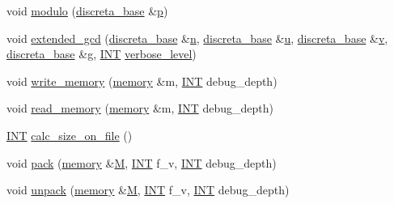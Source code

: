 \begin{DoxyCompactItemize}
\item 
void \mbox{\hyperlink{classdiscreta__base_ac4ee015a4115c5f5851cb3da41c8eca0}{modulo}} (\mbox{\hyperlink{classdiscreta__base}{discreta\+\_\+base}} \&\mbox{\hyperlink{alphabet2_8_c_a533391314665d6bf1b5575e9a9cd8552}{p}})
\item 
void \mbox{\hyperlink{classdiscreta__base_acf4c69f8f0f01f8af975c131121180f4}{extended\+\_\+gcd}} (\mbox{\hyperlink{classdiscreta__base}{discreta\+\_\+base}} \&\mbox{\hyperlink{simeon_8_c_a7f2cd26777ce0ff3fdaf8d02aacbddfb}{n}}, \mbox{\hyperlink{classdiscreta__base}{discreta\+\_\+base}} \&\mbox{\hyperlink{alphabet2_8_c_a5874b4c2ec2e28321eea4e4871d08222}{u}}, \mbox{\hyperlink{classdiscreta__base}{discreta\+\_\+base}} \&\mbox{\hyperlink{simeon_8_c_aeb3f3030944801b163bc3b829a7f6710}{v}}, \mbox{\hyperlink{classdiscreta__base}{discreta\+\_\+base}} \&g, \mbox{\hyperlink{galois_8h_a09fddde158a3a20bd2dcadb609de11dc}{I\+NT}} \mbox{\hyperlink{simeon_8_c_a818073fbcc2f439e7c56952f67386122}{verbose\+\_\+level}})
\item 
void \mbox{\hyperlink{classdiscreta__base_a449ed7914b693346288f56a60b12c4af}{write\+\_\+memory}} (\mbox{\hyperlink{classmemory}{memory}} \&m, \mbox{\hyperlink{galois_8h_a09fddde158a3a20bd2dcadb609de11dc}{I\+NT}} debug\+\_\+depth)
\item 
void \mbox{\hyperlink{classdiscreta__base_a224239da232eb4165783845a48e8b170}{read\+\_\+memory}} (\mbox{\hyperlink{classmemory}{memory}} \&m, \mbox{\hyperlink{galois_8h_a09fddde158a3a20bd2dcadb609de11dc}{I\+NT}} debug\+\_\+depth)
\item 
\mbox{\hyperlink{galois_8h_a09fddde158a3a20bd2dcadb609de11dc}{I\+NT}} \mbox{\hyperlink{classdiscreta__base_ae342640849a0b5bd6096b8e29c7145ff}{calc\+\_\+size\+\_\+on\+\_\+file}} ()
\item 
void \mbox{\hyperlink{classdiscreta__base_aca663109cfebec3214b8f55a1234b3a1}{pack}} (\mbox{\hyperlink{classmemory}{memory}} \&\mbox{\hyperlink{plane__search_8_c_ad2d23ebd03187a91edd45b1d5e496265}{M}}, \mbox{\hyperlink{galois_8h_a09fddde158a3a20bd2dcadb609de11dc}{I\+NT}} f\+\_\+v, \mbox{\hyperlink{galois_8h_a09fddde158a3a20bd2dcadb609de11dc}{I\+NT}} debug\+\_\+depth)
\item 
void \mbox{\hyperlink{classdiscreta__base_a62b20a8798c6fcfdc2ee4555bc3004b3}{unpack}} (\mbox{\hyperlink{classmemory}{memory}} \&\mbox{\hyperlink{plane__search_8_c_ad2d23ebd03187a91edd45b1d5e496265}{M}}, \mbox{\hyperlink{galois_8h_a09fddde158a3a20bd2dcadb609de11dc}{I\+NT}} f\+\_\+v, \mbox{\hyperlink{galois_8h_a09fddde158a3a20bd2dcadb609de11dc}{I\+NT}} debug\+\_\+depth)

\end{DoxyCompactItemize}
